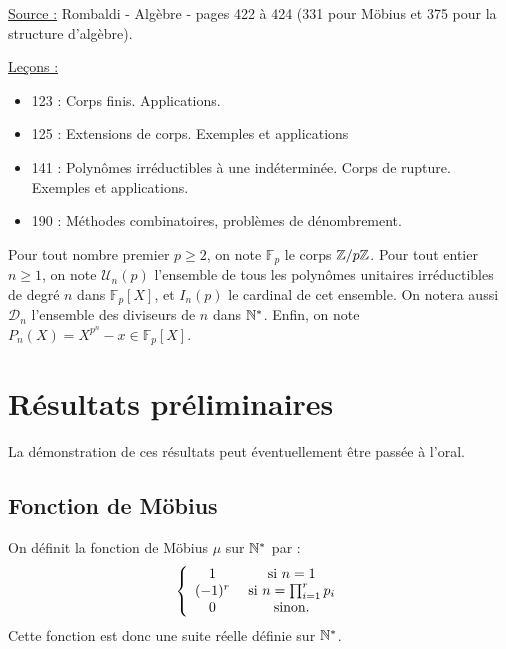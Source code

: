 

\pagestyle{fancy}

\fancyhead[R]{}

\newcommand{\D}{\mathcal{D}}
\newcommand{\U}{\mathcal{U}}
\newcommand{\Fp}{\mathbb{F}_p}
\newcommand{\Fpd}{\mathbb{F}_{p^d}}



\underline{Source :} Rombaldi - Algèbre - pages 422 à 424 (331 pour Möbius et 375 pour la structure d'algèbre). \newline

\underline{Leçons :}
\begin{itemize}
\item    123 : Corps finis. Applications.
\item    125 : Extensions de corps. Exemples et applications
\item    141 : Polynômes irréductibles à une indéterminée. Corps de rupture. Exemples et applications.
\item    190 : Méthodes combinatoires, problèmes de dénombrement.
\end{itemize}

\begin{nota}
Pour tout nombre premier $p \geq 2$, on note $\Fp$ le corps $\mathbb{Z}/p\mathbb{Z}$. 
Pour tout entier $n \geq 1$, on note $\U_n(p)$ l'ensemble de tous les polynômes unitaires irréductibles de degré $n$ dans $\Fp[X]$,
et $I_n(p)$ le cardinal de cet ensemble. On notera aussi $\D_n$ l'ensemble des diviseurs de $n$ dans $\mathbb{N}^\ast$.
Enfin, on note $P_n(X) = X^{p^n} - x \in \Fp[X]$.
\end{nota}

\section{Résultats préliminaires}

La démonstration de ces résultats peut éventuellement être passée à l'oral.

\subsection{Fonction de Möbius}

\begin{defn}
On définit la fonction de Möbius $\mu$ sur $\mathbb{N}^\ast$ par :
\[ \left \{ \begin{array}{c c} 
1 & \text{ si } n = 1 \\
(-1)^r & \text{ si } n = \prod_{i=1}^r p_i \\
0 & \text{ sinon}.
\end{array} \right. \]
Cette fonction est donc une suite réelle définie sur $\mathbb{N}^\ast$.
\end{defn}

